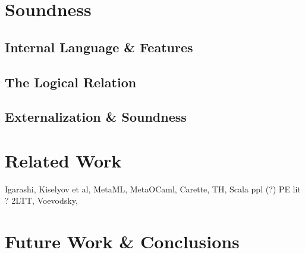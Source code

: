 \documentclass[acmsmall]{acmart}
\theoremstyle{remark}
\begin{document}
\section{Soundness}

\subsection{Internal Language \& Features}
\subsection{The Logical Relation}
\subsection{Externalization \& Soundness}

\section{Related Work}

Igarashi, Kiselyov et al, MetaML, MetaOCaml, Carette, TH, Scala ppl (?)
PE lit ?
2LTT, Voevodsky,

\section{Future Work \& Conclusions}




\end{document}
